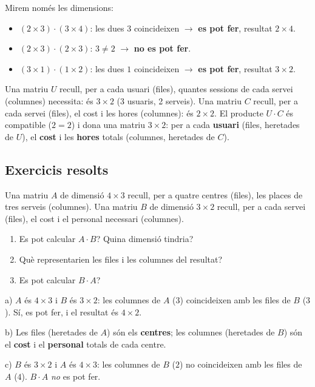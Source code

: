 \begin{exemple}
Mirem només les dimensions:
\begin{itemize}[leftmargin=1.4em, itemsep=2pt]
  \item $(2\times 3)\cdot(3\times 4)$: les dues $3$ coincideixen $\rightarrow$
        \textbf{es pot fer}, resultat $2\times 4$.
  \item $(2\times 3)\cdot(2\times 3)$: $3\neq 2$ $\rightarrow$ \textbf{no es pot fer}.
  \item $(3\times 1)\cdot(1\times 2)$: les dues $1$ coincideixen $\rightarrow$
        \textbf{es pot fer}, resultat $3\times 2$.
\end{itemize}
\end{exemple}

\begin{exemple}
Una matriu $U$ recull, per a cada usuari (files), quantes sessions de cada servei
(columnes) necessita: és $3\times 2$ (3 usuaris, 2 serveis). Una matriu $C$ recull,
per a cada servei (files), el cost i les hores (columnes): és $2\times 2$.
El producte $U\cdot C$ és compatible ($2=2$) i dona una matriu $3\times 2$: per a
cada \textbf{usuari} (files, heretades de $U$), el \textbf{cost} i les \textbf{hores}
totals (columnes, heretades de $C$).
\end{exemple}

\subsection{Exercicis resolts}

\begin{exresolt}
Una matriu $A$ de dimensió $4\times 3$ recull, per a quatre centres (files), les
places de tres serveis (columnes). Una matriu $B$ de dimensió $3\times 2$ recull,
per a cada servei (files), el cost i el personal necessari (columnes).
\begin{enumerate}[label=\alph*), leftmargin=1.6em, topsep=2pt]
  \item Es pot calcular $A\cdot B$? Quina dimensió tindria?
  \item Què representarien les files i les columnes del resultat?
  \item Es pot calcular $B\cdot A$?
\end{enumerate}
\solucio
a) $A$ és $4\times 3$ i $B$ és $3\times 2$: les columnes de $A$ ($3$) coincideixen
amb les files de $B$ ($3$). Sí, es pot fer, i el resultat és $4\times 2$.

b) Les files (heretades de $A$) són els \textbf{centres}; les columnes (heretades
de $B$) són el \textbf{cost} i el \textbf{personal} totals de cada centre.

c) $B$ és $3\times 2$ i $A$ és $4\times 3$: les columnes de $B$ ($2$) no
coincideixen amb les files de $A$ ($4$). $B\cdot A$ \emph{no} es pot fer.
\end{exresolt}

